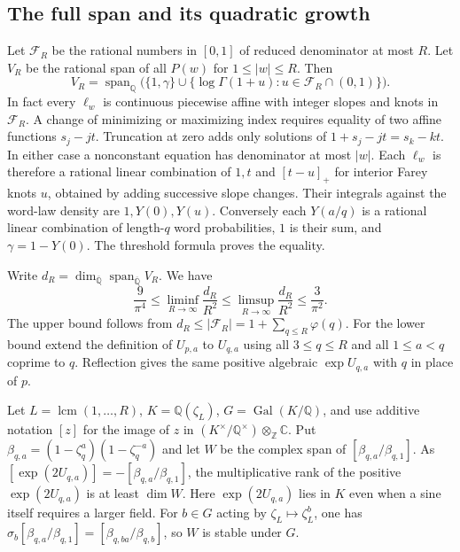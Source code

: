 \documentclass[11pt,a4paper,oneside,openany]{report}
\theoremstyle{remark}\newtheorem{remark}[theorem]{Remark}
\numberwithin{equation}{section}
\begin{document}
\subsection{The full span and its quadratic growth}
Let $\mathcal F_R$ be the rational numbers in $[0,1]$ of reduced
denominator at most $R$. Let $V_R$ be the rational span of all $P(w)$
for $1\le |w|\le R$. Then
\[
 V_R=\operatorname{span}_{\mathbb Q}
 \bigl(\{1,\gamma\}\cup
 \{\log\Gamma(1+u):u\in\mathcal F_R\cap(0,1)\}\bigr).
\]
In fact every $\ell_w$ is continuous piecewise affine with integer slopes
and knots in $\mathcal F_R$. A change of minimizing or maximizing index
requires equality of two affine functions $s_j-jt$. Truncation at zero
adds only solutions of $1+s_j-jt=s_k-kt$. In either case a nonconstant
equation has denominator at most $|w|$. Each $\ell_w$ is therefore a
rational linear combination of $1,t$ and $[t-u]_+$ for interior Farey
knots $u$, obtained by adding successive slope changes. Their integrals
against the word-law density are $1,Y(0),Y(u)$. Conversely each $Y(a/q)$
is a rational linear combination of length-$q$ word probabilities, $1$
is their sum, and $\gamma=1-Y(0)$. The threshold formula proves the
equality.

Write $d_R=\dim_{\overline{\mathbb Q}}\operatorname{span}_{\overline{\mathbb Q}} V_R$.
We have
\[
 \frac{9}{\pi^4}\le\liminf_{R\to\infty}\frac{d_R}{R^2}
 \le\limsup_{R\to\infty}\frac{d_R}{R^2}\le\frac{3}{\pi^2}.
\]
The upper bound follows from $d_R\le |\mathcal F_R|
=1+\sum_{q\le R}\varphi(q)$. For the lower bound extend the definition of
$U_{p,a}$ to $U_{q,a}$ using all $3\le q\le R$ and all $1\le a<q$
coprime to $q$. Reflection gives the same positive algebraic
$\exp U_{q,a}$ with $q$ in place of $p$.

Let $L=\operatorname{lcm}(1,\ldots,R)$, $K=\mathbb Q(\zeta_L)$,
$G=\operatorname{Gal}(K/\mathbb Q)$, and use additive notation $[z]$
for the image of $z$ in $(K^\times/\mathbb Q^\times)\otimes_{\mathbb Z}\mathbb C$.
Put $\beta_{q,a}=(1-\zeta_q^a)(1-\zeta_q^{-a})$ and let $W$ be the complex
span of $[\beta_{q,a}/\beta_{q,1}]$. As $[\exp(2U_{q,a})]
=-[\beta_{q,a}/\beta_{q,1}]$, the multiplicative rank of the positive
$\exp(2U_{q,a})$ is at least $\dim W$. Here $\exp(2U_{q,a})$ lies in $K$
even when a sine itself requires a larger field. For $b\in G$ acting
by $\zeta_L\mapsto\zeta_L^b$, one has
$\sigma_b[\beta_{q,a}/\beta_{q,1}]=[\beta_{q,ba}/\beta_{q,b}]$, so $W$
is stable under $G$.
\end{document}
